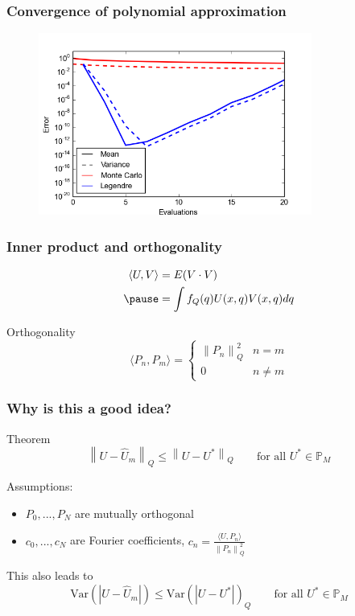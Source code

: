 \documentclass[handout]{beamer}
\newcommand{\norm}[1]{\left\lVert#1\right\rVert}
\begin{document}
\begin{frame}
  \frametitle{Convergence of polynomial approximation}

  \begin{figure}
    \includegraphics[width=0.8\textwidth]{MC_convergence_1D_2.png}
  \end{figure}
  
\end{frame}


\begin{frame}
  \frametitle{Inner product and orthogonality}

    \begin{align*}
    \langle U,V \rangle &= E(V\cdot V)\\
    \pause
    &= \int f_Q(q)U(x,q)V(x,q)dq
  \end{align*}

  \pause
  Orthogonality
  \[\langle P_n,P_m\rangle =
  \begin{cases}
    \norm{P_n}^2_Q & n = m \\
    0 & n \neq m
  \end{cases}\]

\end{frame}

\begin{frame}
\frametitle{Why is this a good idea?}
\begin{block}{Theorem}
  \[\norm{U-\hat{U}_m}_Q \leq \norm{U-U^*}_Q \qquad \text{for all } U^* \in \mathbb{P}_M\]
\end{block}
Assumptions: 
\begin{itemize}
  \item $P_0,...,P_N$ are mutually orthogonal
  \item $c_0,...,c_N$ are Fourier coefficients, $c_n = \frac{\langle U, P_n\rangle}{\norm{P_n}^2_Q}$
 \end{itemize}
 This also leads to 
  \[\text{Var}(|U-\hat{U}_m|)\leq \text{Var}(|U-U^*|)_Q \qquad \text{for all } U^* \in \mathbb{P}_M\]
\end{frame}
\end{document}
